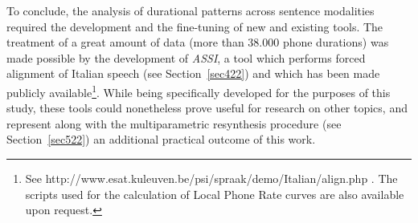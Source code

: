 To conclude, the analysis of durational patterns across sentence modalities required the development and the fine-tuning of new and existing tools. The treatment of a great amount of data (more than 38.000 phone durations) was made possible by the development of \textit{ASSI}, a tool which performs forced alignment of Italian speech (see Section~\ref{sec422}) and which has been made publicly available\footnote{See http://www.esat.kuleuven.be/psi/spraak/demo/Italian/align.php . The scripts used for the calculation of Local Phone Rate curves are also available upon request.}. While being specifically developed for the purposes of this study, these tools could nonetheless prove useful for research on other topics, and represent along with the multiparametric resynthesis procedure (see Section~\ref{sec522}) an additional practical outcome of this work.